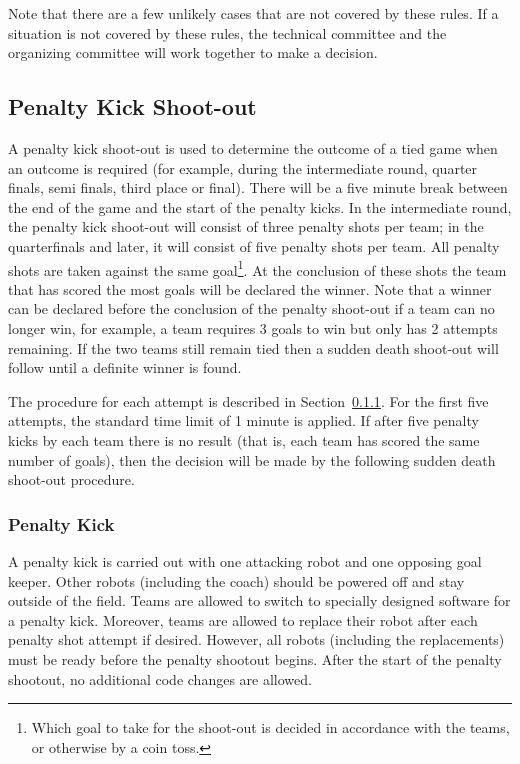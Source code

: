\documentclass[12pt]{article}
\begin{document}
Note that there are a few unlikely cases that are not covered by these rules.  If a situation is not covered by these rules, the technical committee and the organizing committee will work together to make a decision.

\subsection{Penalty Kick Shoot-out}
\label{sec:penalty_shoot-out}

A penalty kick shoot-out is used to determine the outcome of a tied game when an outcome is required (for example, during the intermediate round, quarter finals, semi finals, third place or final). 
There will be a five minute break between the end of the game and the start of the penalty kicks.
In the intermediate round, the penalty kick shoot-out will consist of three penalty shots per team; in the quarterfinals and later, it will consist of five penalty shots per team.
All penalty shots are taken against the same goal\footnote{Which goal to take for the shoot-out is decided in accordance with the teams, or otherwise by a coin toss.}. At the conclusion of these shots the team that has scored the most goals will be declared the winner. Note that a winner can be declared before the conclusion of the penalty shoot-out if a team can no longer win, for example, a team requires 3 goals to win but only has 2 attempts remaining. If the two teams still remain tied then a sudden death shoot-out will follow until a definite winner is found.

The procedure for each attempt is described in Section~\ref{sec:penalty_kick}. For the first five attempts, the standard time limit of 1 minute is applied. If after five penalty kicks by each team there is no result (that is, each team has scored the same number of goals), then the decision will be made by the following sudden death shoot-out procedure.

\subsubsection{Penalty Kick}
\label{sec:penalty_kick}

A penalty kick is carried out with one attacking robot and one opposing goal keeper. Other robots (including the coach) should be powered off and stay outside of the field. Teams are allowed to switch to specially designed software for a penalty kick.  Moreover, teams are allowed to replace their robot after each penalty shot attempt if desired.  However, all robots (including the replacements) must be ready before the penalty shootout begins. After the start of the penalty shootout, no additional code changes are allowed.
\end{document}
